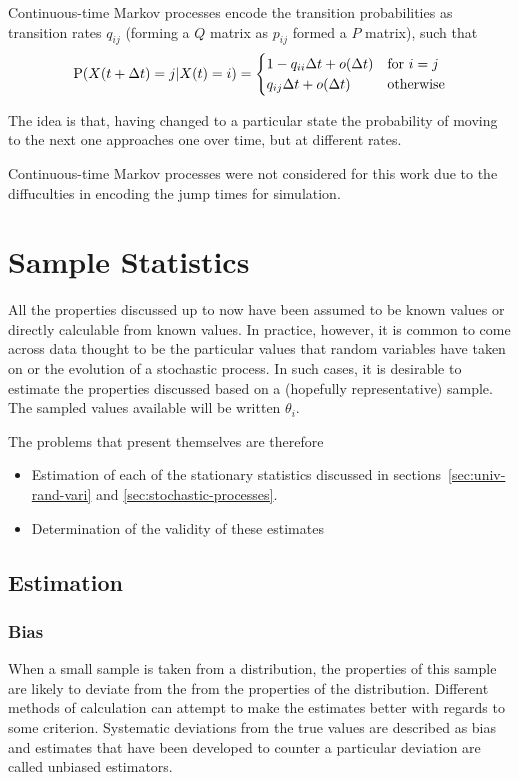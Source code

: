 Continuous-time Markov processes encode the transition probabilities as transition rates $q_{ij}$ (forming a $Q$ matrix as $p_{ij}$ formed a $P$ matrix), such that
\begin{equation}
  \label{eq:contmarkov}
  \mathrm{P}(X(t+\Delta t) = j | X(t) = i) = 
  \begin{cases}
    1 - q_{ii}\Delta t + o(\Delta t) & \text{for } i = j \\
    q_{ij}\Delta t + o(\Delta t) & \text{otherwise}
  \end{cases}
\end{equation}

The idea is that, having changed to a particular state the probability of moving to the next one approaches one over time, but at different rates.

Continuous-time Markov processes were not considered for this work due to the diffuculties in encoding the jump times for simulation.

\section{Sample Statistics}
All the properties discussed up to now have been assumed to be known values or directly calculable from known values.
In practice, however, it is common to come across data thought to be the particular values that random variables have taken on or the evolution of a stochastic process.
In such cases, it is desirable to estimate the properties discussed based on a (hopefully representative) sample.
The sampled values available will be written $\theta_i$.

The problems that present themselves are therefore
\begin{itemize}
\item Estimation of each of the stationary statistics discussed in sections~\ref{sec:univ-rand-vari} and \ref{sec:stochastic-processes}.
\item Determination of the validity of these estimates
\end{itemize}

\subsection{Estimation}
\subsubsection{Bias}
When a small sample is taken from a distribution, the properties of this sample are likely to deviate from the from the properties of the distribution.
Different methods of calculation can attempt to make the estimates better with regards to some criterion.
Systematic deviations from the true values are described as bias and estimates that have been developed to counter a particular deviation are called unbiased estimators.

